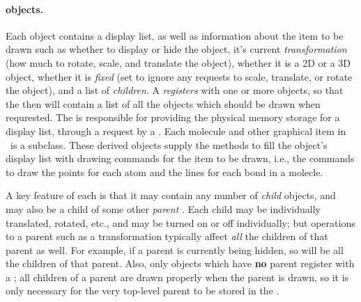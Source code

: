 \paragraph{ objects.}
Each  object contains a display list, as well as information about the item to be drawn such as whether to display or hide the object, it's current {\em transformation} (how much to rotate, scale, and translate the object), whether it is a 2D or a 3D object, whether it is {\em fixed} (set to ignore any requests to scale, translate, or rotate the object), and a list of {\em children}.  A  {\em registers} with one or more  objects, so that the  then will contain a list of all the  objects which should be drawn when requrested.  The  is responsible for providing the physical memory storage for a display list, through a request by a .  Each molecule and other graphical item in \VMD\ is a  subclass.  These derived objects supply the methods to fill the object's display list with drawing commands for the item to be drawn, i.e., the commands to draw the points for each atom and the lines for each bond in a molecle.

A key feature of each  is that it may contain any number of {\em child}  objects, and may also be a child of some other {\em parent} .  Each child may be individually translated, rotated, etc., and may be turned on or off individually; but operations to a parent such as a transformation typically affect {\em all} the children of that parent as well.  For example, if a parent is currently being hidden, so will be all the children of that parent.  Also, only  objects which have {\bf no} parent register with a ; all children of a parent are drawn properly when the parent is drawn, so it is only necessary for the very top-level parent to be stored in the .


